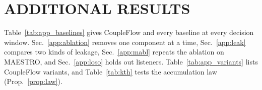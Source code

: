 \documentclass[twoside]{article}
\begin{document}
\section{ADDITIONAL RESULTS}\label{app:results}
Table~\ref{tab:app_baselines} gives CoupleFlow and every baseline at every decision window.
Sec.~\ref{app:ablation} removes one component at a time, Sec.~\ref{app:leak} compares two
kinds of leakage, Sec.~\ref{app:mabl} repeats the ablation on MAESTRO, and
Sec.~\ref{app:loso} holds out listeners. Table~\ref{tab:app_variants} lists CoupleFlow
variants, and Table~\ref{tab:kth} tests the accumulation law (Prop.~\ref{prop:law}).
\begin{table}[h]\centering\small
\caption{CoupleFlow and every baseline at every window (\%, content-disjoint folds, pooled over
all test windows; competing talker for two-talker sets, match--mismatch for SparrKULee and
MEG-MASC). CoupleFlow: mean of 3 seeds with the validation-chosen lag window, as in
Table~\ref{tab:main}; ``CoupleFlow, mm'': match--mismatch on the two-talker recordings. trial:
one decision per trial. ``--'': window longer than the trials. CoupleFlow nulls:
\nullShortMin--\nullShortMax\% up to 10\,s; \nullLongMin--\nullLongMax\% at 20--60\,s, where
few windows exist. DECAF, trained with the same folds and selection rule, stays near chance on the
two-talker sets.}
\label{tab:app_baselines}

\end{table}





\FloatBarrier
\end{document}
